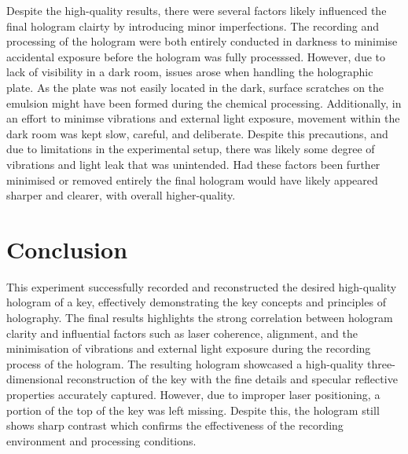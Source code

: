 \documentclass[12pt]{article}
\begin{document}
Despite the high-quality results, there were several factors likely influenced the final hologram clairty by introducing minor imperfections. The recording and processing of the hologram were both entirely conducted in darkness to minimise accidental exposure before the hologram was fully processsed.
However, due to lack of visibility in a dark room, issues arose when handling the holographic plate. As the plate was not easily located in the dark, surface scratches on the emulsion might have been formed during the chemical processing. Additionally, in an effort to minimse vibrations and external light exposure,
movement within the dark room was kept slow, careful, and deliberate. Despite this precautions, and due to limitations in the experimental setup, there was likely some degree of vibrations and light leak that was unintended. Had these factors been further minimised or removed entirely the final hologram would have likely appeared sharper and clearer, with overall
higher-quality.

\vspace{2.5cm}

\section{Conclusion} \label{sec:4}

This experiment successfully recorded and reconstructed the desired high-quality hologram of a key, effectively demonstrating the key concepts and principles of holography. The final results highlights the strong correlation between
hologram clarity and influential factors such as laser coherence, alignment, and the minimisation of vibrations and external light exposure during the recording process of the hologram. The resulting hologram showcased a high-quality three-dimensional
reconstruction of the key with the fine details and specular reflective properties accurately captured. However, due to improper laser positioning, a portion of the top of the key was left missing. Despite this, the hologram still shows sharp contrast which confirms the effectiveness of the 
recording environment and processing conditions.
\end{document}
